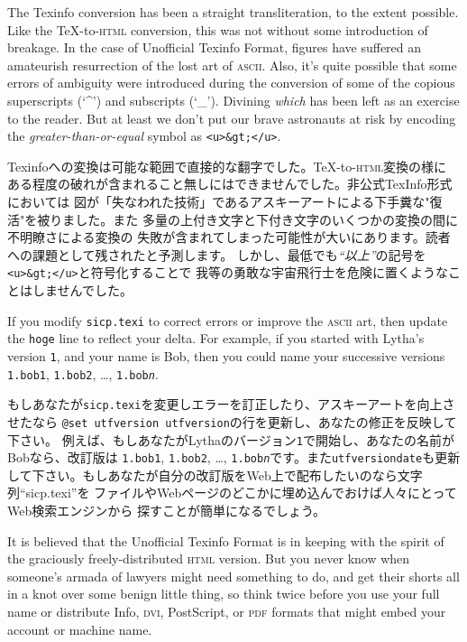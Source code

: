 \documentclass[8pt,oneside]{book}
\newcommand{\acronym}[1]{\textsc{\MakeLowercase{#1}}}
\newcommand{\code}[1]{\texttt{#1}}
\begin{document}
The Texinfo conversion has been a straight transliteration, to the extent
possible.  Like the {\TeX}-to-\acronym{HTML} conversion, this was not without
some introduction of breakage.  In the case of Unofficial Texinfo Format,
figures have suffered an amateurish resurrection of the lost art of
\acronym{ASCII}.  Also, it's quite possible that some errors of ambiguity
were introduced during the conversion of some of the copious superscripts (`\^{}')
and subscripts (`\_').  Divining \emph{which} has been left as an exercise to
the reader. But at least we don't put our brave astronauts at risk by encoding
the \emph{greater-than-or-equal} symbol as \code{<u>\&gt;</u>}.

Texinfoへの変換は可能な範囲で直接的な翻字でした。{\TeX}-to-\acronym{HTML}変換の様に
ある程度の破れが含まれること無しにはできませんでした。非公式TexInfo形式においては
図が「失なわれた技術」であるアスキーアートによる下手糞な"復活"を被りました。また
多量の上付き文字と下付き文字のいくつかの変換の間に不明瞭さによる変換の
失敗が含まれてしまった可能性が大いにあります。読者への課題として残されたと予測します。
しかし、最低でも\emph{``以上''}の記号を\texttt{<u>\&gt;</u>}と符号化することで
我等の勇敢な宇宙飛行士を危険に置くようなことはしませんでした。

If you modify \texttt{sicp.texi} to correct errors or improve the
\acronym{ASCII} art, then update the \code{hoge}
line to reflect your delta.  For example, if you started with Lytha's version
\code{1}, and your name is Bob, then you could name your successive versions
\code{1.bob1}, \code{1.bob2},  \dots , \code{1.bob\textit{n}}. 

もしあなたが\texttt{sicp.texi}を変更しエラーを訂正したり、アスキーアートを向上させたなら
\code{@set utfversion {utfversion}}の行を更新し、あなたの修正を反映して下さい。
例えば、もしあなたがLythaのバージョン\code{1}で開始し、あなたの名前がBobなら、改訂版は
\code{1.bob1}, \code{1.bob2}, \dots , \code{1.bob\textit{n}}です。また\code{utfversiondate}も更新
して下さい。もしあなたが自分の改訂版をWeb上で配布したいのなら文字列``sicp.texi''を
ファイルやWebページのどこかに埋め込んでおけば人々にとってWeb検索エンジンから
探すことが簡単になるでしょう。

It is believed that the Unofficial Texinfo Format is in keeping with the
spirit of the graciously freely-distributed \acronym{HTML} version.  But you
never know when someone's armada of lawyers might need something to do, and get
their shorts all in a knot over some benign little thing, so think twice before
you use your full name or distribute Info, \acronym{DVI}, PostScript, or
\acronym{PDF} formats that might embed your account or machine name.
\end{document}
